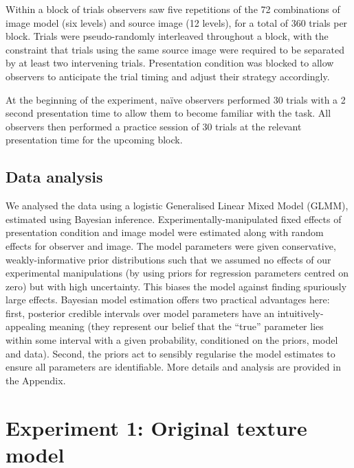 \documentclass[article, 11pt,a4paper,natbib]{apa6}\usepackage[]{graphicx}\usepackage[]{color}
\begin{document}
Within a block of trials observers saw five repetitions of the 72 combinations of image model (six levels) and source image (12 levels), for a total of 360 trials per block.
Trials were pseudo-randomly interleaved throughout a block, with the constraint that trials using the same source image were required to be separated by at least two intervening trials. 
Presentation condition was blocked to allow observers to anticipate the trial timing and adjust their strategy accordingly.

At the beginning of the experiment, na\"{i}ve observers performed 30 trials with a 2 second presentation time to allow them to become familiar with the task.
All observers then performed a practice session of 30 trials at the relevant presentation time for the upcoming block.

\subsection{Data analysis}

We analysed the data using a logistic Generalised Linear Mixed Model (GLMM), estimated using Bayesian inference.
Experimentally-manipulated fixed effects of presentation condition and image model were estimated along with random effects for observer and image.
The model parameters were given conservative, weakly-informative prior distributions such that we assumed no effects of our experimental manipulations (by using priors for regression parameters centred on zero) but with high uncertainty.
This biases the model against finding spuriously large effects.
Bayesian model estimation offers two practical advantages here: first, posterior credible intervals over model parameters have an intuitively-appealing meaning (they represent our belief that the ``true'' parameter lies within some interval with a given probability, conditioned on the priors, model and data). 
Second, the priors act to sensibly regularise the model estimates to ensure all parameters are identifiable.
More details and analysis are provided in the Appendix.

\section{Experiment 1: Original texture model}
\end{document}
